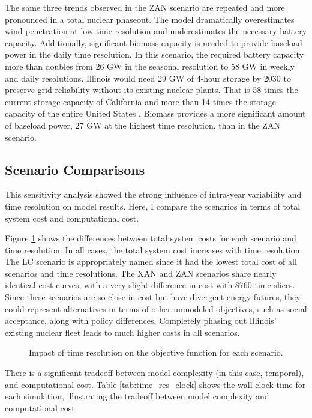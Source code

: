 The same three trends observed in the \gls{ZAN} scenario are repeated and
more pronounced in a total nuclear phaseout. The model dramatically overestimates
wind penetration at low time resolution and underestimates the necessary battery capacity.
Additionally, significant biomass capacity is needed to provide baseload
power in the daily time resolution.
In this scenario, the required battery capacity more than doubles from 26 GW in the
seasonal resolution to 58 GW in weekly and daily resolutions. Illinois would need 29 GW of 4-hour
storage by 2030 to preserve grid reliability without its existing nuclear plants.
That is 58 times the current storage capacity of California and more than
14 times the storage capacity of the entire United States
\cite{hutchins_us_2021}.
Biomass provides a more significant amount of baseload power, 27 GW at the highest
time resolution, than in the \gls{ZAN} scenario.

\subsection{Scenario Comparisons}
This sensitivity analysis showed the strong influence of intra-year variability
and time resolution on model results. Here, I compare the scenarios in terms
of total system cost and computational cost.

Figure \ref{fig:time_res_cost} shows the differences between total system costs
for each scenario and time resolution.
In all cases, the total system cost increases with time resolution. The \gls{LC}
scenario is appropriately named since it had the lowest total cost
of all scenarios and time resolutions. The \gls{XAN} and \gls{ZAN} scenarios share
nearly identical cost curves,
with a very slight difference in cost with 8760 time-slices. Since these scenarios
are so close in cost but have divergent energy futures, they could represent
alternatives in terms of other unmodeled objectives, such as social acceptance,
along with policy differences. Completely phasing out Illinois' existing nuclear
fleet leads to much higher costs in all scenarios.

\begin{figure}[H]
  \centering
  \resizebox{0.75\columnwidth}{!}{}
  \caption{Impact of time resolution on the objective function for each scenario.}
  \label{fig:time_res_cost}
\end{figure}



There is a significant tradeoff between model complexity (in this case, temporal),
and computational cost. Table \ref{tab:time_res_clock} shows the
wall-clock time for each simulation, illustrating the tradeoff between model
complexity and computational cost.

